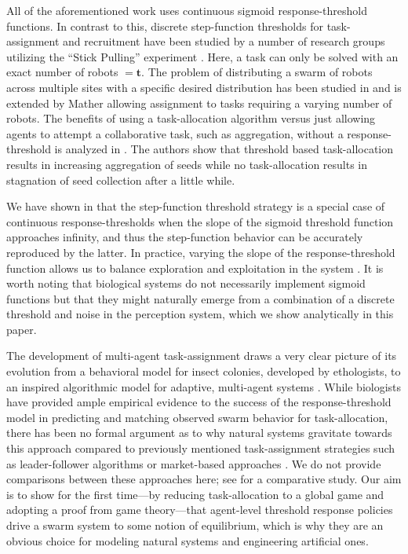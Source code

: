 \documentclass[conference]{ieeeconf}
\def\td{\mathbf{t}}   %
\begin{document}
All of the aforementioned work uses continuous sigmoid response-threshold functions. In contrast to this, discrete step-function thresholds for task-assignment and recruitment have been studied by a number of research groups utilizing the ``Stick Pulling'' experiment \cite{Martinoli1995, Martinoli1998, Lerman2001, Martinoli2004}. Here, a task can only be solved with an exact number of robots $= \td$. The problem of distributing a swarm of robots across multiple sites with a specific desired distribution has been studied in \cite{Berman2009, Correll2008} and is extended by Mather \cite{Mather2010} allowing assignment to tasks requiring a varying number of robots. The benefits of using a task-allocation algorithm versus just allowing agents to attempt a collaborative task, such as aggregation, without a response-threshold is analyzed in \cite{Agassounon2001}. The authors show that threshold based task-allocation results in increasing aggregation of seeds while no task-allocation results in stagnation of seed collection after a little while. 

We have shown in \cite{Kanakia2014} that the step-function threshold strategy is a special case of continuous response-thresholds when the slope of the sigmoid threshold function approaches infinity, and thus the step-function behavior can be accurately reproduced by the latter. In practice, varying the slope of the response-threshold function allows us to balance exploration and exploitation in the system \cite{Bonabeau1997}. It is worth noting that biological systems do not necessarily implement sigmoid functions but that they might naturally emerge from a combination of a discrete threshold and noise in the perception system, which we show analytically in this paper. 

The development of multi-agent task-assignment draws a very clear picture of its evolution from a behavioral model for insect colonies, developed by ethologists, to an inspired algorithmic model for adaptive, multi-agent systems \cite{Krieger2000}. While biologists have provided ample empirical evidence to the success of the response-threshold model in predicting and matching observed swarm behavior for task-allocation, there has been no formal argument as to why natural systems gravitate towards this approach compared to previously mentioned task-assignment strategies such as leader-follower algorithms \cite{Chen2011} or market-based approaches \cite{Amstutz2008,Vig2007}. We do not provide comparisons between these approaches here; see \cite{Kalra2006} for a comparative study. Our aim is to show for the first time---by reducing task-allocation to a global game and adopting a proof from game theory\cite{Carlsson1993}---that agent-level threshold response policies drive a swarm system to some notion of equilibrium, which is why they are an obvious choice for modeling natural systems and engineering artificial ones.
\end{document}
